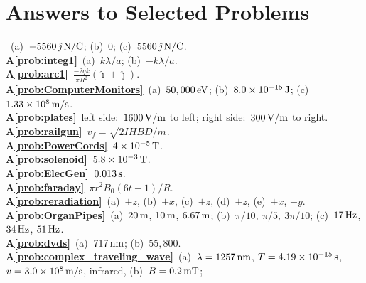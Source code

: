 \chapter*{Answers to Selected Problems}
\label{chap:selected_answers}


~(a)~$-5560\, \hat \jmath \,\mbox{N/C}$; 
(b)~$0$; (c)~$5560\, \hat \jmath \,\mbox{N/C}$.\\
{\bf A\ref{prob:integ1}}~(a)~$k\lambda / a$; (b)~$-k\lambda / a$.\\
{\bf A\ref{prob:arc1}}~$\frac{-2qk}{\pi R^2}(\hat\imath + \hat\jmath)$.\\
{\bf A\ref{prob:ComputerMonitors}}~(a)~$50,000\,\mbox{eV}$; 
(b)~$8.0 \times 10^{-15}\,\mbox{J}$;
(c)~$1.33 \times 10^8\,\mbox{m/s}$.\\
{\bf A\ref{prob:plates}}~left side:~$1600\,\mbox{V/m}$ to left; 
right side:~$300\,\mbox{V/m}$ to right.\\
{\bf A\ref{prob:railgun}}~$v_f = \sqrt{2IHBD/m}$.\\
{\bf A\ref{prob:PowerCords}}~$4 \times 10^{-5}\,\mbox{T}$.\\
{\bf A\ref{prob:solenoid}}~$5.8 \times 10^{-3}\,\mbox{T}$.\\
{\bf A\ref{prob:ElecGen}}~$0.013\,\mbox{s}$.\\
{\bf A\ref{prob:faraday}}~$\pi r^2 B_0(6t-1)/R$.\\
{\bf A\ref{prob:reradiation}}~(a)~$\pm z$, (b)~$\pm x$, (c)~$\pm z$,
(d)~$\pm z$, (e)~$\pm x$, $\pm y$.\\
{\bf A\ref{prob:OrganPipes}}~(a)~$20\,\mbox{m}$, $10\,\mbox{m}$, $6.67\,\mbox{m}$; 
(b)~$\pi /10,\ \pi /5,\ 3\pi /10$; 
(c)~$17\,\mbox{Hz}$, $34\,\mbox{Hz}$, $51\,\mbox{Hz}$.\\
{\bf A\ref{prob:dvds}}~(a)~$717\,\mbox{nm}$; (b)~$55,800$.\\
{\bf A\ref{prob:complex_traveling_wave}}~(a)~$\lambda = 1257\,\mbox{nm}$, 
$T = 4.19\times 10^{-15}\,\mbox{s}$, $v = 3.0\times 10^8\,\mbox{m/s}$, infrared,
(b)~$B = 0.2\,\mbox{mT}$;\\
